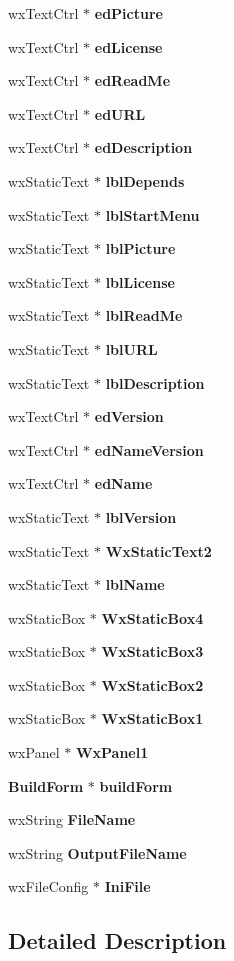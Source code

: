 \begin{CompactItemize}
wx\-Text\-Ctrl $\ast$ {\bf ed\-Picture}
\item 
wx\-Text\-Ctrl $\ast$ {\bf ed\-License}
\item 
wx\-Text\-Ctrl $\ast$ {\bf ed\-Read\-Me}
\item 
wx\-Text\-Ctrl $\ast$ {\bf ed\-URL}
\item 
wx\-Text\-Ctrl $\ast$ {\bf ed\-Description}
\item 
wx\-Static\-Text $\ast$ {\bf lbl\-Depends}
\item 
wx\-Static\-Text $\ast$ {\bf lbl\-Start\-Menu}
\item 
wx\-Static\-Text $\ast$ {\bf lbl\-Picture}
\item 
wx\-Static\-Text $\ast$ {\bf lbl\-License}
\item 
wx\-Static\-Text $\ast$ {\bf lbl\-Read\-Me}
\item 
wx\-Static\-Text $\ast$ {\bf lbl\-URL}
\item 
wx\-Static\-Text $\ast$ {\bf lbl\-Description}
\item 
wx\-Text\-Ctrl $\ast$ {\bf ed\-Version}
\item 
wx\-Text\-Ctrl $\ast$ {\bf ed\-Name\-Version}
\item 
wx\-Text\-Ctrl $\ast$ {\bf ed\-Name}
\item 
wx\-Static\-Text $\ast$ {\bf lbl\-Version}
\item 
wx\-Static\-Text $\ast$ {\bf Wx\-Static\-Text2}
\item 
wx\-Static\-Text $\ast$ {\bf lbl\-Name}
\item 
wx\-Static\-Box $\ast$ {\bf Wx\-Static\-Box4}
\item 
wx\-Static\-Box $\ast$ {\bf Wx\-Static\-Box3}
\item 
wx\-Static\-Box $\ast$ {\bf Wx\-Static\-Box2}
\item 
wx\-Static\-Box $\ast$ {\bf Wx\-Static\-Box1}
\item 
wx\-Panel $\ast$ {\bf Wx\-Panel1}
\item 
{\bf Build\-Form} $\ast$ {\bf build\-Form}
\item 
wx\-String {\bf File\-Name}
\item 
wx\-String {\bf Output\-File\-Name}
\item 
wx\-File\-Config $\ast$ {\bf Ini\-File}
\end{CompactItemize}


\subsection{Detailed Description}




